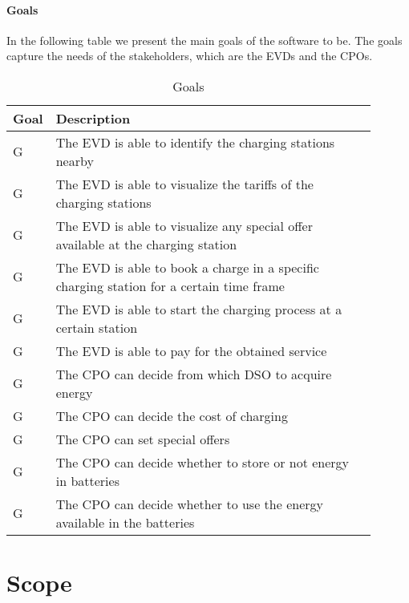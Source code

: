\paragraph{Goals} In the following table we present the main goals of the software to be. The goals capture the needs of the stakeholders, which are the EVDs and the CPOs.

\setcounter{gc}{1}
\newcommand{\gcnt}{\thegc\stepcounter{gc}}
\begin{table}[H]
    \centering
    \begin{tabular}{|l|p{0.9\linewidth}|}
     \hline
     \textbf{Goal} & \textbf{Description} \\
     \hline
     G\gcnt & The EVD is able to identify the charging stations nearby \\
     \hline
     G\gcnt & The EVD is able to visualize the tariffs of the charging stations \\
     \hline
     G\gcnt & The EVD is able to visualize any special offer available at the charging station \\
     \hline
     G\gcnt & The EVD is able to book a charge in a specific charging station for a certain time frame\\
     \hline
     G\gcnt & The EVD is able to start the charging process at a certain station \\
     \hline
     G\gcnt & The EVD is able to pay for the obtained service \\
     \hline
     G\gcnt & The CPO can decide from which DSO to acquire energy \\
     \hline 
     G\gcnt & The CPO can decide the cost of charging \\
     \hline 
     G\gcnt & The CPO can set special offers \\
     \hline 
     G\gcnt & The CPO can decide whether to store or not energy in batteries \\
     \hline 
     G\gcnt & The CPO can decide whether to use the energy available in the batteries \\
     \hline 
\end{tabular}
    \caption{Goals}
    \label{tab:Goals}
\end{table}

\section{Scope}
\label{sec:Scope}%
